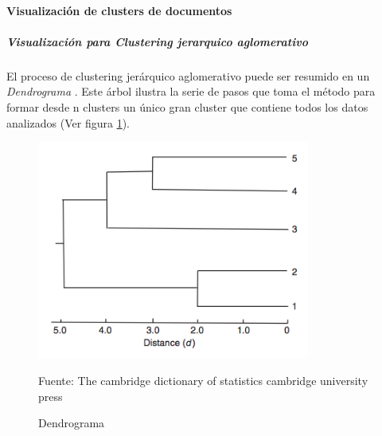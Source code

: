 \paragraph{Visualización de clusters de documentos}
\subparagraph{Visualización para Clustering jerarquico aglomerativo}
\subparagraph*{}
    El proceso de clustering jerárquico aglomerativo puede ser resumido en un \textit{Dendrograma} \cite{everitt1998cambridge}. Este árbol ilustra la serie de pasos que toma el método para formar desde n clusters un único gran cluster que contiene todos los datos analizados (Ver figura \ref{fig:Dendrogram}). 

    \begin{figure}[H]
        \centering
        \includegraphics[width=0.8\textwidth]{figures/Dendrogram.png}
        \caption{\label{fig:Dendrogram} Dendrograma} Fuente: 
        The cambridge dictionary of statistics cambridge university press \cite{everitt1998cambridge}
    \end{figure}
    


